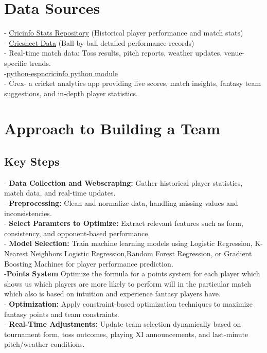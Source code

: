\documentclass[a4paper,12pt]{article}
\begin{document}
\section{Data Sources}
- \href{https://stats.espncricinfo.com}{Cricinfo Stats Repository} (Historical player performance and match stats)\\
- \href{https://cricsheet.org}{Cricsheet Data} (Ball-by-ball detailed performance records)\\
- Real-time match data: Toss results, pitch reports, weather updates, venue-specific trends.\\
-\href{https://github.com/outside-edge/python-espncricinfo}{python-espncricinfo python module}\\
- Crex- a cricket analytics app providing live scores, match insights, fantasy team suggestions, and in-depth player statistics. 

\section{Approach to Building a Team}
\subsection{Key Steps}
- \textbf{Data Collection and Webscraping:} Gather historical player statistics, match data, and real-time updates.\\
- \textbf{Preprocessing:} Clean and normalize data, handling missing values and inconsistencies.\\
- \textbf{Select Paramters to Optimize:} Extract relevant features such as form, consistency, and opponent-based performance.\\
- \textbf{Model Selection:} Train machine learning models using Logistic Regression, K-Nearest Neighbors Logistic Regression,Random Forest Regression, or Gradient Boosting Machines for player performance prediction.\\
-\textbf{Points System} Optimize the formula for a points system for each player which shows us which players are more likely to perform will in the particular match which also is based on intuition and experience fantasy players have.\\
- \textbf{Optimization:} Apply constraint-based optimization techniques to maximize fantasy points and team constraints.\\
- \textbf{Real-Time Adjustments:} Update team selection dynamically based on tournament form, toss outcomes, playing XI announcements, and last-minute pitch/weather conditions.
\end{document}
